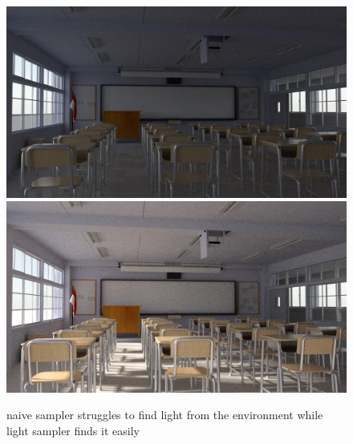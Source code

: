 \documentclass[12pt]{report}
\begin{document}
    \begin{figure}[h]
        \caption{naive sampler struggles to find light from the environment while light sampler finds it easily}
        \includegraphics[width=\textwidth]{classroom_naive}
        \includegraphics[width=\textwidth]{classroom_path}
        \centering
        \label{fig:classroom}
    \end{figure}
\end{document}
